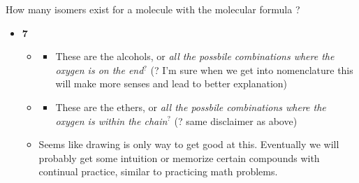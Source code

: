 \documentclass[12pt,a4paper]{article}
\begin{document}
\begin{enumerate}
    {\color{G-Moon}\item How many isomers exist for a molecule with the molecular formula ?}
        \begin{itemize}
            \item {\color{o-Sun}\textbf{7}}
                \begin{itemize}
                    \item {\tiny{}
                          \hspace{12pt}
                          \hspace{12pt}
                          \hspace{12pt}
                          }
                        \begin{itemize}
                            \item These are the alcohols, or {\color{y-Sun}\textit{all the possbile combinations where the oxygen is on the end}\(^{?}\)} ({\color{y-Sun}?} I'm sure when we get into nomenclature this will make more senses and lead to better explanation)
                        \end{itemize}
                    \item {\tiny{}
                          \hspace{12pt} 
                          \hspace{12pt} 
                          }
                        \begin{itemize}
                            \item These are the ethers, or {\color{y-Sun}\textit{all the possbile combinations where the oxygen is within the chain}\(^{?}\)} ({\color{y-Sun}?} same disclaimer as above)
                        \end{itemize}
                    \item Seems like drawing is only way to get good at this. Eventually we will probably get some intuition or memorize certain compounds with continual practice, similar to practicing math problems.
                \end{itemize}
        \end{itemize}

\end{enumerate}
\end{document}
